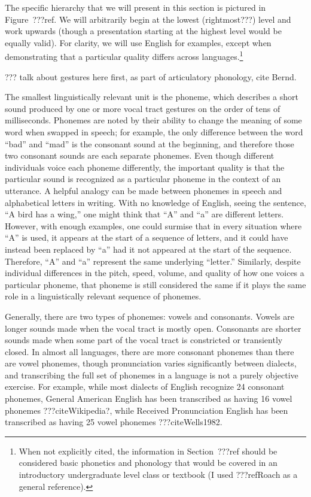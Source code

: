 The specific hierarchy that we will
present in this section is pictured
in Figure~???ref.
We will arbitrarily begin at
the lowest (rightmost???) level and work upwards
(though a presentation starting at
the highest level would be equally valid).
For clarity, we will use English for examples,
except when demonstrating that a particular
quality differs across languages.\footnote{
  When not explicitly cited,
  the information in Section~???ref
  should be considered
  basic phonetics and phonology
  that would be covered in an
  introductory undergraduate level
  class or textbook
  (I used ???refRoach as a general reference).}

??? talk about gestures here first,
as part of articulatory phonology,
cite Bernd.

The smallest linguistically relevant unit
is the phoneme, which describes
a short sound produced by one or more
vocal tract gestures
on the order of tens of milliseconds.
Phonemes are noted by their ability
to change the meaning of some word
when swapped in speech;
for example, the only difference between
the word ``bad'' and ``mad'' is the
consonant sound at the beginning,
and therefore those two consonant sounds
are each separate phonemes.
Even though different individuals
voice each phoneme differently,
the important quality is that
the particular sound is recognized
as a particular phoneme
in the context of an utterance.
A helpful analogy can be made between
phonemes in speech
and alphabetical letters in writing.
With no knowledge of English,
seeing the sentence,
``A bird has a wing,''
one might think that ``A'' and ``a''
are different letters.
However, with enough examples,
one could surmise that in every situation
where ``A'' is used, it appears at the
start of a sequence of letters,
and it could have instead
been replaced by ``a''
had it not appeared at the start of the sequence.
Therefore, ``A'' and ``a'' represent
the same underlying ``letter.''
Similarly, despite individual differences
in the pitch, speed, volume, and quality
of how one voices a particular phoneme,
that phoneme is still considered the same
if it plays the same role
in a linguistically relevant sequence of phonemes.

Generally, there are two types of phonemes:
vowels and consonants.
Vowels are longer sounds
made when the vocal tract is mostly open.
Consonants are shorter sounds
made when some part of the vocal tract
is constricted or transiently closed.
In almost all languages,
there are more consonant phonemes
than there are vowel phonemes,
though pronunciation varies significantly
between dialects,
and transcribing the full set of
phonemes in a language is
not a purely objective exercise.
For example, while most dialects
of English recognize 24 consonant phonemes,
General American English has been transcribed
as having 16 vowel phonemes ???citeWikipedia?,
while Received Pronunciation English
has been transcribed as having 25 vowel phonemes
???citeWells1982.

